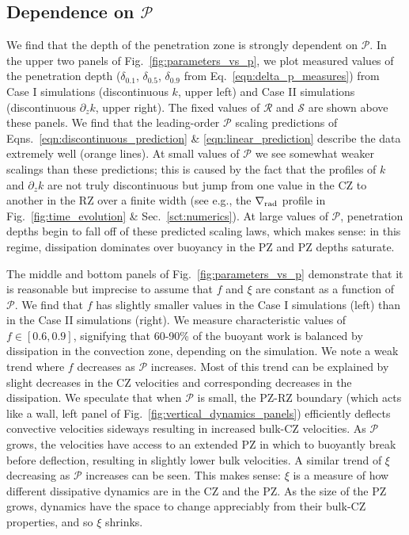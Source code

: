 \documentclass[twocolumn]{aastex631}
\newcommand{\gradrad}{\ensuremath{\nabla_{\rm{rad}}}}
\newcommand{\mP}{\ensuremath{\mathcal{P}}}
\newcommand{\mR}{\ensuremath{\mathcal{R}}}
\newcommand{\mS}{\ensuremath{\mathcal{S}}}
\begin{document}
\subsection{Dependence on $\mP$}
We find that the depth of the penetration zone is strongly dependent on $\mP$.
In the upper two panels of Fig.~\ref{fig:parameters_vs_p}, we plot measured values of the penetration depth ($\delta_{0.1}$, $\delta_{0.5}$, $\delta_{0.9}$ from Eq.~\ref{eqn:delta_p_measures}) from Case I simulations (discontinuous $k$, upper left) and Case II simulations (discontinuous $\partial_z k$, upper right).
The fixed values of $\mR$ and $\mS$ are shown above these panels.
We find that the leading-order $\mP$ scaling predictions of Eqns.~\ref{eqn:discontinuous_prediction} \& \ref{eqn:linear_prediction} describe the data extremely well (orange lines).
At small values of $\mP$ we see somewhat weaker scalings than these predictions; this is caused by the fact that the profiles of $k$ and $\partial_z k$ are not truly discontinuous but jump from one value in the CZ to another in the RZ over a finite width (see e.g., the $\gradrad$ profile in Fig.~\ref{fig:time_evolution} \& Sec.~\ref{sct:numerics}).
At large values of $\mP$, penetration depths begin to fall off of these predicted scaling laws, which makes sense: in this regime, dissipation dominates over buoyancy in the PZ and PZ depths saturate.

The middle and bottom panels of Fig.~\ref{fig:parameters_vs_p} demonstrate that it is reasonable but imprecise to assume that $f$ and $\xi$ are constant as a function of $\mP$.
We find that $f$ has slightly smaller values in the Case I simulations (left) than in the Case II simulations (right).
We measure characteristic values of $f \in [0.6, 0.9]$, signifying that 60-90\% of the buoyant work is balanced by dissipation in the convection zone, depending on the simulation.
We note a weak trend where $f$ decreases as $\mP$ increases.
Most of this trend can be explained by slight decreases in the CZ velocities and corresponding decreases in the dissipation.
We speculate that when $\mP$ is small, the PZ-RZ boundary (which acts like a wall, left panel of Fig.~\ref{fig:vertical_dynamics_panels}) efficiently deflects convective velocities sideways resulting in increased bulk-CZ velocities.
As $\mP$ grows, the velocities have access to an extended PZ in which to buoyantly break before deflection, resulting in slightly lower bulk velocities.
A similar trend of $\xi$ decreasing as $\mP$ increases can be seen.
This makes sense: $\xi$ is a measure of how different dissipative dynamics are in the CZ and the PZ.
As the size of the PZ grows, dynamics have the space to change appreciably from their bulk-CZ properties, and so $\xi$ shrinks.
\end{document}
